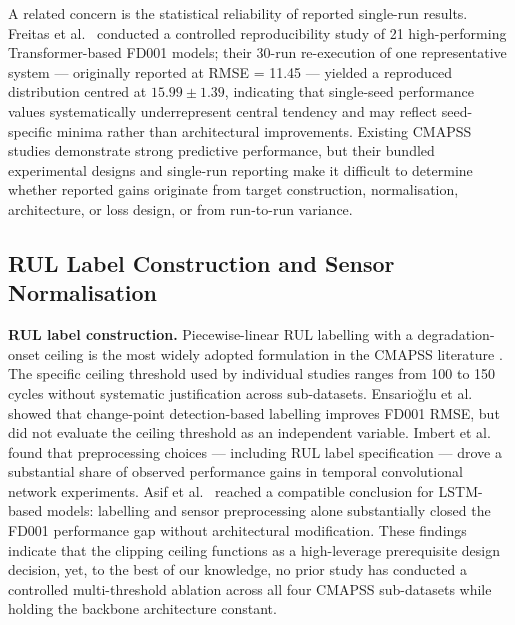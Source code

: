 \documentclass[preprint,10pt]{elsarticle}
\begin{document}
A related concern is the statistical reliability of reported single-run results. Freitas et al.\ \cite{ref51} conducted a controlled reproducibility study of 21 high-performing Transformer-based FD001 models; their 30-run re-execution of one representative system --- originally reported at RMSE = 11.45 --- yielded a reproduced distribution centred at $15.99 \pm 1.39$, indicating that single-seed performance values systematically underrepresent central tendency and may reflect seed-specific minima rather than architectural improvements. Existing CMAPSS studies demonstrate strong predictive performance, but their bundled experimental designs and single-run reporting make it difficult to determine whether reported gains originate from target construction, normalisation, architecture, or loss design, or from run-to-run variance.

\subsection{RUL Label Construction and Sensor Normalisation}

\textbf{RUL label construction.} Piecewise-linear RUL labelling with a degradation-onset ceiling is the most widely adopted formulation in the CMAPSS literature \cite{ref05,ref06}. The specific ceiling threshold used by individual studies ranges from 100 to 150 cycles without systematic justification across sub-datasets. Ensario\u{g}lu et al.\ \cite{ref19} showed that change-point detection-based labelling improves FD001 RMSE, but did not evaluate the ceiling threshold as an independent variable. Imbert et al.\ \cite{ref18} found that preprocessing choices --- including RUL label specification --- drove a substantial share of observed performance gains in temporal convolutional network experiments. Asif et al.\ \cite{ref42} reached a compatible conclusion for LSTM-based models: labelling and sensor preprocessing alone substantially closed the FD001 performance gap without architectural modification. These findings indicate that the clipping ceiling functions as a high-leverage prerequisite design decision, yet, to the best of our knowledge, no prior study has conducted a controlled multi-threshold ablation across all four CMAPSS sub-datasets while holding the backbone architecture constant.
\end{document}
